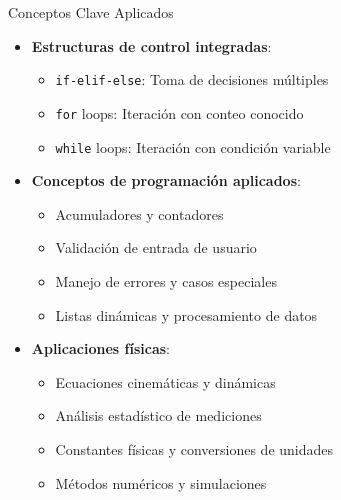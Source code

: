 \documentclass[10pt]{beamer}
\begin{document}
\begin{frame}{Conceptos Clave Aplicados}
  \begin{itemize}
    \item \textbf{Estructuras de control integradas}:
      \begin{itemize}
        \item \texttt{if-elif-else}: Toma de decisiones múltiples
        \item \texttt{for} loops: Iteración con conteo conocido
        \item \texttt{while} loops: Iteración con condición variable
      \end{itemize}
    \item \textbf{Conceptos de programación aplicados}:
      \begin{itemize}
        \item Acumuladores y contadores
        \item Validación de entrada de usuario
        \item Manejo de errores y casos especiales
        \item Listas dinámicas y procesamiento de datos
      \end{itemize}
    \item \textbf{Aplicaciones físicas}:
      \begin{itemize}
        \item Ecuaciones cinemáticas y dinámicas
        \item Análisis estadístico de mediciones
        \item Constantes físicas y conversiones de unidades
        \item Métodos numéricos y simulaciones
      \end{itemize}
  \end{itemize}
\end{frame}
\end{document}
